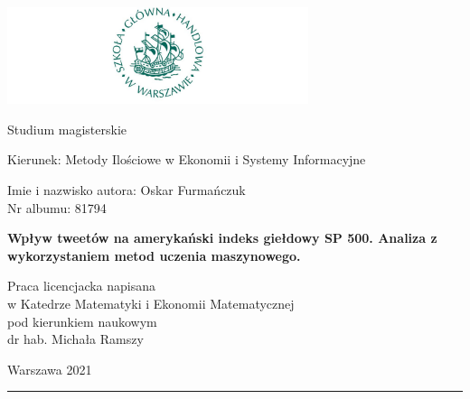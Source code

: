 \documentclass[polish, twoside, 12pt, a4paper]{article}
\theoremstyle{definition}
\theoremstyle{plain}
\theoremstyle{remark}
\begin{document}
\begin{titlepage}
\centering

\includegraphics[width=0.66\textwidth]{logo.JPG}

\vspace*{0.5cm}
Studium magisterskie\\
\begin{flushleft}
Kierunek: Metody Ilościowe w Ekonomii i Systemy Informacyjne\\
\end{flushleft}

\vspace*{.5cm}
\rule{0cm}{1cm}\hfill
\begin{minipage}{9cm}
Imie i nazwisko autora: Oskar Furmańczuk\\
Nr albumu: 81794
\end{minipage}

\vspace*{1cm}
\begin{minipage}{12cm}
\centering
\Large
\textbf{Wpływ tweetów na amerykański indeks giełdowy SP 500. Analiza z wykorzystaniem metod uczenia maszynowego.}
\end{minipage}

\vspace*{2cm}
\rule{0cm}{1cm}\hfill
\begin{minipage}{9cm}
Praca licencjacka napisana\\
w Katedrze Matematyki i Ekonomii Matematycznej\\
pod kierunkiem naukowym\\
dr hab. Michała Ramszy
\end{minipage}

\vfill
Warszawa 2021
\end{titlepage}

\rule{1ex}{0ex}\clearpage


\cleardoublepage
\tableofcontents

\cleardoublepage
\end{document}
